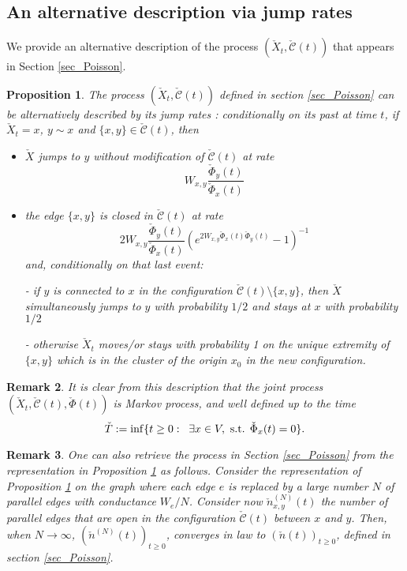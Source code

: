 \documentclass[11pt,a4paper]{amsart}
\numberwithin{equation}{section}
\newtheorem{proposition}{Proposition}[section]
\newtheorem{remark}[proposition]{Remark}
\def\ccc{{\mathcal C}}
\begin{document}
\subsection{An alternative description via jump rates}\label{sec_jump}
We provide an alternative description of the process $(\check X_t, \check \ccc(t))$ that appears in Section \ref{sec_Poisson}.

\begin{proposition}\label{prop-jump}
The process $(\check X_t, \check\ccc(t))$ defined in section \ref{sec_Poisson} can be alternatively described by its jump rates :
conditionally on its past at time $t$, if $\check X_t=x$, $y\sim x$ and $\lbrace x,y\rbrace\in \check{\mathcal{C}}(t)$, then
\begin{itemize}
\item[(1)]  $\check X$ jumps to $y$ without modification of $\check\ccc(t)$ at rate
\begin{displaymath}
W_{x,y}\dfrac{\check\Phi_{y}(t)}{\check\Phi_{x}(t)}
\end{displaymath}
\item[(2)]  the edge $\lbrace x,y\rbrace$ is closed in $\check\ccc(t)$ at rate
\begin{displaymath}
2W_{x,y}\dfrac{\check\Phi_{y}(t)}{\check\Phi_{x}(t)}
\left(e^{2W_{x,y}\check\Phi_{x}(t)\check\Phi_{y}(t)}-1\right)^{-1}
\end{displaymath}
and, conditionally on that last event:

- if $y$ is connected to
$x$ in the configuration $\check \ccc(t)\setminus\{x,y\}$, then $\check X$ simultaneously jumps to $y$ with probability $1/2$ and stays at $x$ with probability $1/2$

- otherwise $\check X_t$ moves/or stays with probability 1 on the unique extremity
of $\{x,y\}$ which is in the cluster of the origin $x_0$ in the new configuration.
\end{itemize}
\end{proposition}
\begin{remark}
It is clear from this description that the joint process $(\check X_t, \check \ccc(t), \check \Phi(t))$ is Markov process, and well defined up to the time
$$
\check T:=\inf\{t\ge 0:\;\;  \exists x\in V, \hbox{ s.t. } \check\Phi_x(t)=0\}.
$$
\end{remark}

\begin{remark}
One can also retrieve the process in Section \ref{sec_Poisson} from the representation in Proposition \ref{prop-jump} as follows.
Consider the representation of Proposition \ref{prop-jump} on the graph where each edge $e$ is replaced by a large number $N$ of 
parallel edges with conductance $W_e/N$. Consider now $\check n^{(N)}_{x,y}(t)$ the number of parallel edges that are open in the configuration
$\check \ccc(t)$ between $x$ and $y$. Then, when $N\to\infty$, $(\check n^{(N)}(t))_{t\ge0}$,  converges in law to 
$(\check n(t))_{t\ge0}$,  defined in section \ref{sec_Poisson}.
\end{remark}
\end{document}

